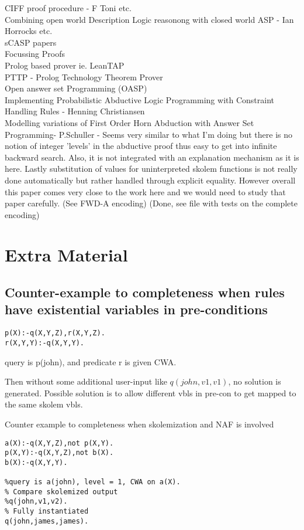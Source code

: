 \documentclass{article}
\begin{document}
CIFF proof procedure - F Toni etc.\\
Combining open world Description Logic reasonong with closed world ASP - Ian Horrocks etc.\\
sCASP papers\\
Focussing Proofs\\
Prolog based prover ie. LeanTAP\\
PTTP - Prolog Technology Theorem Prover\\
Open answer set Programming (OASP)\\
Implementing
Probabilistic Abductive Logic Programming
with Constraint Handling Rules - Henning Christiansen\\
Modelling variations of First Order Horn Abduction with Answer Set Programming- P.Schuller - Seems very similar to what I'm doing but there is no notion of integer 'levels' in the abductive proof thus easy to get into infinite backward search. Also, it is not integrated with an explanation mechanism as it is here. Lastly substitution of values for uninterpreted skolem functions is not really done automatically but rather handled through explicit equality. However overall this paper comes very close to the work here and we would need to study that paper carefully. (See FWD-A encoding) (Done, see file with tests on the complete encoding)

\section{Extra Material}
\subsection{Counter-example to completeness when rules have existential variables in pre-conditions}
\begin{verbatim}
p(X):-q(X,Y,Z),r(X,Y,Z).
r(X,Y,Y):-q(X,Y,Y).
\end{verbatim}
query is p(john), and predicate r is given CWA. 

Then without some additional user-input like $q(john, v1,v1)$, no solution is generated. Possible solution is to allow different vbls in pre-con to get mapped to the same skolem vbls.

Counter example to completeness when skolemization and NAF is involved
\begin{verbatim}
a(X):-q(X,Y,Z),not p(X,Y).
p(X,Y):-q(X,Y,Z),not b(X).
b(X):-q(X,Y,Y).

%query is a(john), level = 1, CWA on a(X).
% Compare skolemized output
%q(john,v1,v2).
% Fully instantiated
q(john,james,james).    
\end{verbatim}
\end{document}
